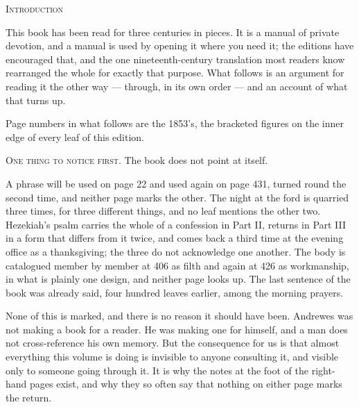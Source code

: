 \begingroup
\setlength{\parskip}{0.55\baselineskip}
\setlength{\parindent}{0pt}
{\centering\Large\scshape Introduction\par}
\vspace{1.5\baselineskip}

This book has been read for three centuries in pieces. It is a manual of private
devotion, and a manual is used by opening it where you need it; the editions have
encouraged that, and the one nineteenth-century translation most readers know
rearranged the whole for exactly that purpose. What follows is an argument for
reading it the other way --- through, in its own order --- and an account of what
that turns up.

Page numbers in what follows are the 1853's, the bracketed figures on the inner
edge of every leaf of this edition.

\vspace{0.8\baselineskip}
{\scshape One thing to notice first.}\quad
The book does not point at itself.

A phrase will be used on page 22 and used again on page 431, turned round the
second time, and neither page marks the other. The night at the ford is quarried
three times, for three different things, and no leaf mentions the other two.
Hezekiah's psalm carries the whole of a confession in Part II, returns in Part III
in a form that differs from it twice, and comes back a third time at the evening
office as a thanksgiving; the three do not acknowledge one another. The body is
catalogued member by member at 406 as filth and again at 426 as workmanship, in
what is plainly one design, and neither page looks up. The last sentence of the
book was already said, four hundred leaves earlier, among the morning prayers.

None of this is marked, and there is no reason it should have been. Andrewes was
not making a book for a reader. He was making one for himself, and a man does not
cross-reference his own memory. But the consequence for us is that almost
everything this volume is doing is invisible to anyone consulting it, and visible
only to someone going through it. It is why the notes at the foot of the
right-hand pages exist, and why they so often say that nothing on either page
marks the return.

